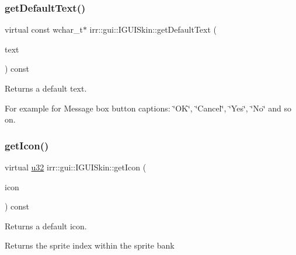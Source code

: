 \subsubsection{\texorpdfstring{get\+Default\+Text()}{getDefaultText()}}
{\footnotesize\ttfamily virtual const wchar\+\_\+t$\ast$ irr\+::gui\+::\+I\+G\+U\+I\+Skin\+::get\+Default\+Text (\begin{DoxyParamCaption}\item[{\hyperlink{namespaceirr_1_1gui_a18bc64c635f8b0db66498d779569e296}{E\+G\+U\+I\+\_\+\+D\+E\+F\+A\+U\+L\+T\+\_\+\+T\+E\+XT}}]{text }\end{DoxyParamCaption}) const\hspace{0.3cm}{\ttfamily [pure virtual]}}



Returns a default text. 

For example for Message box button captions\+: \char`\"{}\+O\+K\char`\"{}, \char`\"{}\+Cancel\char`\"{}, \char`\"{}\+Yes\char`\"{}, \char`\"{}\+No\char`\"{} and so on. \mbox{\label{classirr_1_1gui_1_1IGUISkin_a1b96a5dcaa7ffb9228fc2095be6b18c5}} 
\subsubsection{\texorpdfstring{get\+Icon()}{getIcon()}}
{\footnotesize\ttfamily virtual \hyperlink{namespaceirr_a0416a53257075833e7002efd0a18e804}{u32} irr\+::gui\+::\+I\+G\+U\+I\+Skin\+::get\+Icon (\begin{DoxyParamCaption}\item[{\hyperlink{namespaceirr_1_1gui_a8e54aa253459daf0b62670bda4556d9f}{E\+G\+U\+I\+\_\+\+D\+E\+F\+A\+U\+L\+T\+\_\+\+I\+C\+ON}}]{icon }\end{DoxyParamCaption}) const\hspace{0.3cm}{\ttfamily [pure virtual]}}



Returns a default icon. 

Returns the sprite index within the sprite bank \mbox{\label{classirr_1_1gui_1_1IGUISkin_a782a67363479b5cf7d085189774908ef}} 
